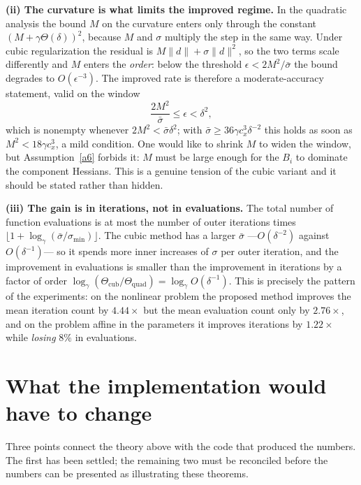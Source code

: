 \documentclass[11pt]{article}
\begin{document}
\medskip
\noindent\textbf{(ii) The curvature is what limits the improved regime.} In the
quadratic analysis the bound $M$ on the curvature enters only through the
constant $(M + \gamma\Theta(\delta))^2$, because $M$ and $\sigma$ multiply the
step in the same way. Under cubic regularization the residual is
$M\|d\| + \sigma\|d\|^2$, so the two terms scale differently and $M$ enters the
\emph{order}: below the threshold $\epsilon < 2M^2/\bar\sigma$ the bound
degrades to $O(\epsilon^{-3})$. The improved rate is therefore a
moderate-accuracy statement, valid on the window
\[
\frac{2M^2}{\bar{\sigma}} \leq \epsilon < \delta^2 ,
\]
which is nonempty whenever $2M^2 < \bar\sigma\delta^2$; with
$\bar\sigma \geq 36\gamma c_x^3\delta^{-2}$ this holds as soon as
$M^2 < 18\gamma c_x^3$, a mild condition. One would like to shrink $M$ to widen
the window, but Assumption~\ref{a6} forbids it: $M$ must be large enough for
the $B_i$ to dominate the component Hessians. This is a genuine tension of the
cubic variant and it should be stated rather than hidden.

\medskip
\noindent\textbf{(iii) The gain is in iterations, not in evaluations.} The
total number of function evaluations is at most the number of outer iterations
times $\lfloor 1 + \log_\gamma(\bar\sigma/\sigma_{\min})\rfloor$. The cubic
method has a larger $\bar\sigma$ ---$O(\delta^{-2})$ against
$O(\delta^{-1})$--- so it spends more inner increases of $\sigma$ per outer
iteration, and the improvement in evaluations is smaller than the improvement
in iterations by a factor of order
$\log_\gamma(\Theta_{\text{cub}}/\Theta_{\text{quad}})
= \log_\gamma O(\delta^{-1})$. This is precisely the pattern of the
experiments: on the nonlinear problem the proposed method improves the mean
iteration count by $4.44\times$ but the mean evaluation count only by
$2.76\times$, and on the problem affine in the parameters it improves
iterations by $1.22\times$ while \emph{losing} $8\%$ in evaluations.

\section{What the implementation would have to change}

Three points connect the theory above with the code that produced the numbers.
The first has been settled; the remaining two must be reconciled before the
numbers can be presented as illustrating these theorems.
\end{document}
